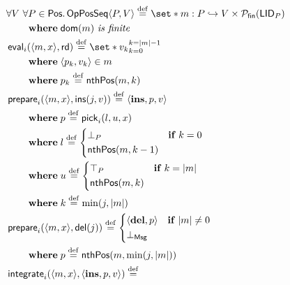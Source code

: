 \begin{figure}[htb]
\begin{align}
&\begin{aligned}
\MoveEqLeft \forall V\ \forall P \in \trm{Pos} \qsep \trm{OpPosSeq}\tuple*{P, V} \defeq \set*{m:P \pto V} \times \powerfset{\trm{LID}_P}\\
&\where \trm{dom}(m)\ \textit{is finite}
\end{aligned}\label{eq:op-seq-state}\\
%
&\begin{aligned}
\MoveEqLeft \trm{eval}_i(\tuple*{m, x}, \trm{rd}) \defeq \set*{v_k}_{k=0}^{k=\card*{m} - 1}\\
& \where \tuple*{p_k, v_k} \in m\\
& \where p_k \defeq \trm{nthPos}(m, k)
\end{aligned}\label{eq:op-seq-eval}\\
%
&\begin{aligned}
\MoveEqLeft \trm{prepare}_i(\tuple*{m,x}, \trm{ins}(j, v)) \defeq \tuple*{\textbf{ins}, p, v}\\
&\where p \defeq \trm{pick}_i(l, u, x)\\
&\where l \defeq \begin{dcases}
  \bot_P & \when k = 0\\
  \trm{nthPos}(m, k - 1) &
\end{dcases}\\
&\where u \defeq \begin{dcases}
  \top_P & \when k = \card*{m}\\
  \trm{nthPos}(m, k) &
\end{dcases}\\
&\where k \defeq \min(j, \card*{m})
\end{aligned}\label{eq:op-seq-prep-ins}\\
%
&\begin{aligned}
\MoveEqLeft \trm{prepare}_i(\tuple*{m,x}, \trm{del}(j)) \defeq%
\begin{dcases}
\tuple*{\textbf{del}, p} & \when \card*{m} \neq 0\\
\bot_{\trm{Msg}} &
\end{dcases}\\
&\where p \defeq \trm{nthPos}(m, \min(j, \card*{m}))\\
\end{aligned}\label{eq:op-seq-prep-del}\\
%
&\begin{aligned}
\MoveEqLeft \trm{integrate}_i(\tuple*{m, x}, \tuple*{\textbf{ins}, p, v}) \defeq%

\end{aligned}
\end{align}
\end{figure}
